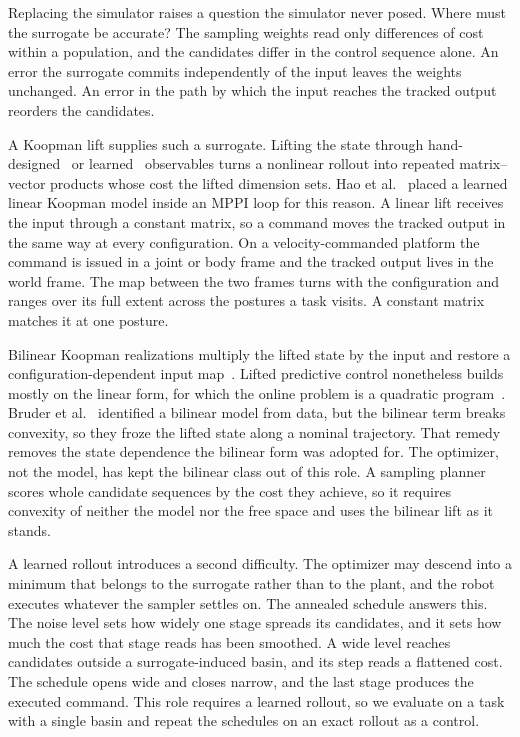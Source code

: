 \documentclass[letterpaper,10pt,conference]{ieeeconf}
\begin{document}
Replacing the simulator raises a question the simulator never posed.
Where must the surrogate be accurate?
The sampling weights read only differences of cost within a population, and the candidates differ in the control sequence alone.
An error the surrogate commits independently of the input leaves the weights unchanged.
An error in the path by which the input reaches the tracked output reorders the candidates.

A Koopman lift supplies such a surrogate.
Lifting the state through hand-designed~\cite{williams2015edmd, proctor2016dmdc} or learned~\cite{lusch2018deep} observables turns a nonlinear rollout into repeated matrix--vector products whose cost the lifted dimension sets.
Hao et al.~\cite{mppidk2026} placed a learned linear Koopman model inside an MPPI loop for this reason.
A linear lift receives the input through a constant matrix, so a command moves the tracked output in the same way at every configuration.
On a velocity-commanded platform the command is issued in a joint or body frame and the tracked output lives in the world frame.
The map between the two frames turns with the configuration and ranges over its full extent across the postures a task visits.
A constant matrix matches it at one posture.

Bilinear Koopman realizations multiply the lifted state by the input and restore a configuration-dependent input map~\cite{iacob2024}.
Lifted predictive control nonetheless builds mostly on the linear form, for which the online problem is a quadratic program~\cite{korda2018mpc}.
Bruder et al.~\cite{bruder2021bilinear} identified a bilinear model from data, but the bilinear term breaks convexity, so they froze the lifted state along a nominal trajectory.
That remedy removes the state dependence the bilinear form was adopted for.
The optimizer, not the model, has kept the bilinear class out of this role.
A sampling planner scores whole candidate sequences by the cost they achieve, so it requires convexity of neither the model nor the free space and uses the bilinear lift as it stands.

A learned rollout introduces a second difficulty.
The optimizer may descend into a minimum that belongs to the surrogate rather than to the plant, and the robot executes whatever the sampler settles on.
The annealed schedule answers this.
The noise level sets how widely one stage spreads its candidates, and it sets how much the cost that stage reads has been smoothed.
A wide level reaches candidates outside a surrogate-induced basin, and its step reads a flattened cost.
The schedule opens wide and closes narrow, and the last stage produces the executed command.
This role requires a learned rollout, so we evaluate on a task with a single basin and repeat the schedules on an exact rollout as a control.
\end{document}
